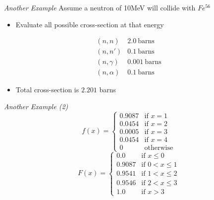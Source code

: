 \emph{Another Example}
  Assume a neutron of 10MeV will collide with $Fe^{56}$
  \begin{itemize}
    \item Evaluate all possible cross-section at that energy
  \end{itemize}
     \begin{displaymath}
        \left. \begin{array}{ll}
               (n,n) & 2.0 \: \textrm{barns}\\
               (n,n') & 0.1 \: \textrm{barns}\\
               (n,\gamma) & 0.001 \: \textrm{barns}\\
               (n,\alpha) & 0.1 \: \textrm{barns}
               \end{array} \right.
  \end{displaymath} 
  \begin{itemize}
    \item Total cross-section is $2.201$ barns
  \end{itemize} 


\emph{Another Example (2)}
     \begin{displaymath}
        f(x) = \left\{ \begin{array}{ll}
                         0.9087 & \textrm{if $x = 1$}\\                       
                         0.0454 & \textrm{if $x = 2$}\\
                         0.0005 & \textrm{if $x = 3$}\\
                         0.0454 & \textrm{if $x = 4$}\\
                         0 & \textrm{otherwise}
                       \end{array} \right.
     \end{displaymath}
     \begin{displaymath}
        F(x) = \left\{ \begin{array}{ll}
                         0.0    & \textrm{if $x \le 0$}\\                       
                         0.9087 & \textrm{if $0 < x \le 1$}\\
                         0.9541 & \textrm{if $1 < x \le 2$}\\
                         0.9546 & \textrm{if $2 < x \le 3$}\\
                         1.0 & \textrm{if $x > 3$}
                       \end{array} \right.
     \end{displaymath}




